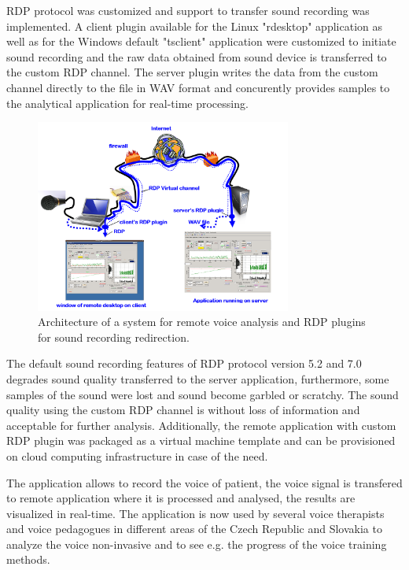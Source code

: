 RDP protocol was customized and support to transfer sound recording was implemented. A client plugin available for the Linux "rdesktop" application as well as for the Windows default "tsclient" application were customized to initiate sound recording and the raw data obtained from sound device is transferred to the custom RDP channel. The server plugin writes the data from the custom channel directly to the file in WAV format and concurently provides samples to the analytical application for real-time processing.
\begin{figure}[hbt]
    \centering
     \includegraphics[width=0.75\textwidth]{schemasystemu.png}  
    \caption{Architecture of a system for remote voice analysis and RDP plugins for sound recording redirection.}
    \label{fig:architectureestimation}
\end{figure}

The default sound recording features of RDP protocol version 5.2 and 7.0 degrades sound quality transferred to the server application, furthermore, some samples of the sound were lost and sound become garbled or scratchy. The sound quality using the custom RDP channel is without loss of information and acceptable for further analysis. Additionally, the remote application with custom RDP plugin was packaged as a virtual machine template and can be provisioned on cloud computing infrastructure in case of the need.

The application allows to record the voice of patient, the voice signal is transfered to remote application where it is processed and analysed, the results are visualized in real-time. The application is now used by several voice therapists and voice pedagogues in different areas of the Czech Republic and Slovakia to analyze the voice non-invasive and to see e.g. the progress of the voice training methods.


